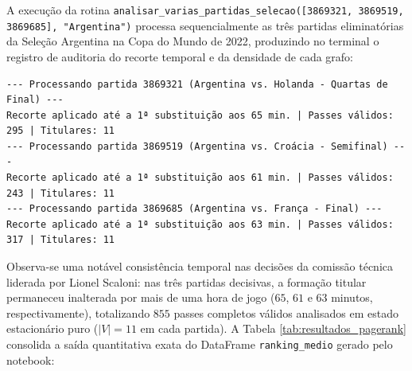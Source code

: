 \documentclass[10pt,a4paper]{article}
\theoremstyle{definition}
\theoremstyle{plain}
\theoremstyle{remark}
\begin{document}
A execução da rotina \texttt{analisar\_varias\_partidas\_selecao([3869321, 3869519, 3869685], "Argentina")} processa sequencialmente as três partidas eliminatórias da Seleção Argentina na Copa do Mundo de 2022, produzindo no terminal o registro de auditoria do recorte temporal e da densidade de cada grafo:

\begin{lstlisting}[caption={Saída de execução do programa para as partidas eliminatórias da Argentina na Copa 2022.}]
--- Processando partida 3869321 (Argentina vs. Holanda - Quartas de Final) ---
Recorte aplicado até a 1ª substituição aos 65 min. | Passes válidos: 295 | Titulares: 11
--- Processando partida 3869519 (Argentina vs. Croácia - Semifinal) ---
Recorte aplicado até a 1ª substituição aos 61 min. | Passes válidos: 243 | Titulares: 11
--- Processando partida 3869685 (Argentina vs. França - Final) ---
Recorte aplicado até a 1ª substituição aos 63 min. | Passes válidos: 317 | Titulares: 11
\end{lstlisting}

Observa-se uma notável consistência temporal nas decisões da comissão técnica liderada por Lionel Scaloni: nas três partidas decisivas, a formação titular permaneceu inalterada por mais de uma hora de jogo ($65$, $61$ e $63$ minutos, respectivamente), totalizando $855$ passes completos válidos analisados em estado estacionário puro ($|V| = 11$ em cada partida). A Tabela \ref{tab:resultados_pagerank} consolida a saída quantitativa exata do DataFrame \texttt{ranking\_medio} gerado pelo notebook:
\end{document}
